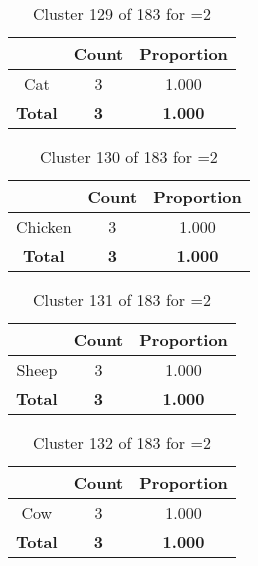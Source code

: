 \begin{table}[ht!]
\centering
\begin{tabular}{|c|c|c|}
\hline
\bf \Spec{} &\bf Count &\bf Proportion\\ \hline \hline
Cat & 3 & 1.000\\ \hline
\hline
\bf Total & \bf 3 & \bf 1.000\\ \hline
\end{tabular}
\label{tab:cluster:129:2}
\caption{Cluster 129 of 183 for \minneigh{}=2}
\end{table}

\clearpage
\begin{table}[ht!]
\centering
\begin{tabular}{|c|c|c|}
\hline
\bf \Spec{} &\bf Count &\bf Proportion\\ \hline \hline
Chicken & 3 & 1.000\\ \hline
\hline
\bf Total & \bf 3 & \bf 1.000\\ \hline
\end{tabular}
\label{tab:cluster:130:2}
\caption{Cluster 130 of 183 for \minneigh{}=2}
\end{table}

\begin{table}[ht!]
\centering
\begin{tabular}{|c|c|c|}
\hline
\bf \Spec{} &\bf Count &\bf Proportion\\ \hline \hline
Sheep & 3 & 1.000\\ \hline
\hline
\bf Total & \bf 3 & \bf 1.000\\ \hline
\end{tabular}
\label{tab:cluster:131:2}
\caption{Cluster 131 of 183 for \minneigh{}=2}
\end{table}

\begin{table}[ht!]
\centering
\begin{tabular}{|c|c|c|}
\hline
\bf \Spec{} &\bf Count &\bf Proportion\\ \hline \hline
Cow & 3 & 1.000\\ \hline
\hline
\bf Total & \bf 3 & \bf 1.000\\ \hline
\end{tabular}
\label{tab:cluster:132:2}
\caption{Cluster 132 of 183 for \minneigh{}=2}
\end{table}

